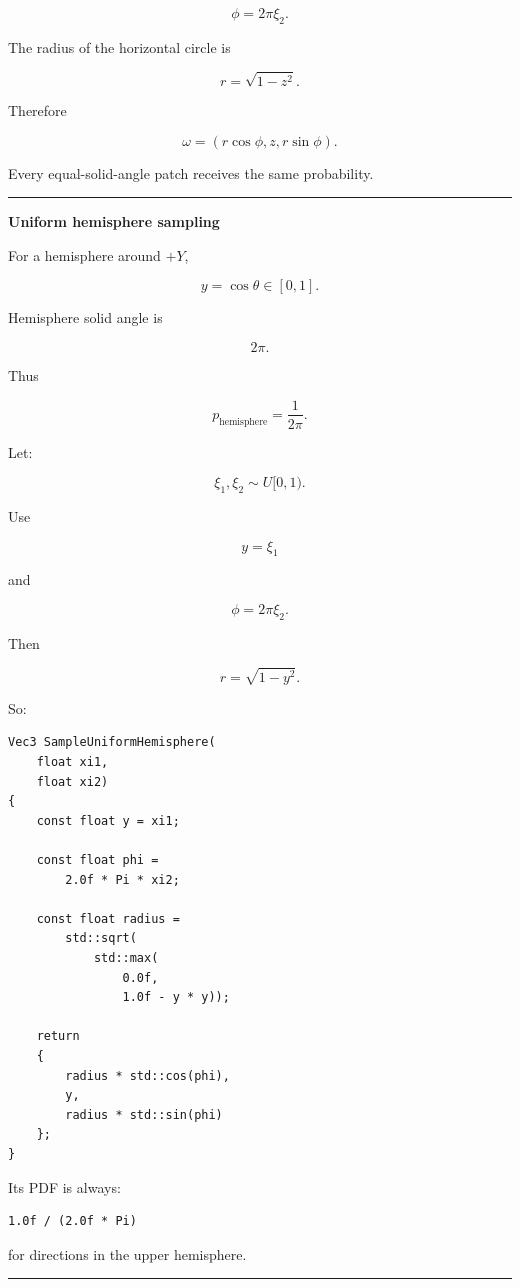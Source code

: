 \[
\boxed{
\phi=2\pi\xi_2.
}
\]

The radius of the horizontal circle is

\[
r=\sqrt{1-z^2}.
\]

Therefore

\[
\boxed{
\omega=
\left(
r\cos\phi,
z,
r\sin\phi
\right).
}
\]

Every equal-solid-angle patch receives the same probability.

\begin{center}\rule{0.5\linewidth}{0.5pt}\end{center}

\textbf{Uniform hemisphere sampling}

For a hemisphere around \(+Y\),

\[
y=\cos\theta\in[0,1].
\]

Hemisphere solid angle is

\[
2\pi.
\]

Thus

\[
\boxed{
p_{\text{hemisphere}}
=
\frac{1}{2\pi}.
}
\]

Let:

\[
\xi_1,\xi_2\sim U[0,1).
\]

Use

\[
\boxed{
y=\xi_1
}
\]

and

\[
\phi=2\pi\xi_2.
\]

Then

\[
r=\sqrt{1-y^2}.
\]

So:

\begin{verbatim}
Vec3 SampleUniformHemisphere(
    float xi1,
    float xi2)
{
    const float y = xi1;

    const float phi =
        2.0f * Pi * xi2;

    const float radius =
        std::sqrt(
            std::max(
                0.0f,
                1.0f - y * y));

    return
    {
        radius * std::cos(phi),
        y,
        radius * std::sin(phi)
    };
}
\end{verbatim}

Its PDF is always:

\begin{verbatim}
1.0f / (2.0f * Pi)
\end{verbatim}

for directions in the upper hemisphere.

\begin{center}\rule{0.5\linewidth}{0.5pt}\end{center}

